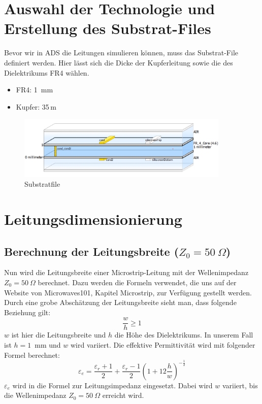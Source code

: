\section{Auswahl der Technologie und Erstellung des Substrat-Files}
Bevor wir in ADS die Leitungen simulieren können, muss das Substrat-File definiert werden.
Hier lässt sich die Dicke der Kupferleitung sowie die des Dielektrikums FR4 wählen.
\begin{itemize}
    \item FR4: 1~mm
    \item Kupfer: 35\,\textmu m
\end{itemize}
\begin{figure}[H]
    \centering
    \includegraphics[width=0.9\textwidth]{Pictures/substratFile.png}
    \caption{Substratfile}
\end{figure}

\section{Leitungsdimensionierung}
\subsection{\texorpdfstring{Berechnung der Leitungsbreite ($Z_0 = 50~\Omega$)}{Berechnung der Leitungsbreite (Z0 = 50 Ohm)}}
Nun wird die Leitungsbreite einer Microstrip-Leitung mit der Wellenimpedanz $Z_0 = 50~\Omega$ berechnet.
Dazu werden die Formeln verwendet, die uns auf der Website von Microwaves101, Kapitel Microstrip, zur
Verfügung gestellt werden. Durch eine grobe Abschätzung der Leitungsbreite sieht man, dass folgende Beziehung gilt: \\
\[
\frac{w}{h} \geq 1
\]
$w$ ist hier die Leitungsbreite und $h$ die Höhe des Dielektrikums. In unserem Fall ist $h = 1$~mm und $w$ wird variiert. Die 
effektive Permittivität wird mit folgender Formel berechnet:
\begin{equation}
\varepsilon_e = \frac{\varepsilon_r + 1}{2} + \frac{\varepsilon_r - 1}{2} \left( 1 + 12 \frac{h}{w} \right)^{-\frac{1}{2}}
\end{equation}
$\varepsilon_e$ wird in die Formel zur Leitungsimpedanz eingesetzt. Dabei wird $w$
variiert, bis die Wellenimpedanz $Z_0 = 50~\Omega$ erreicht wird.

